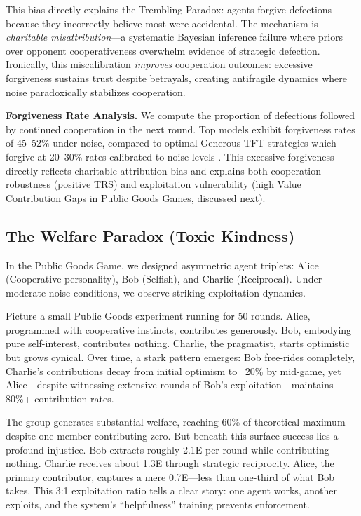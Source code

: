 \documentclass{uai2026} %
\begin{document}
This bias directly explains the Trembling Paradox: agents forgive defections because they incorrectly believe most were accidental. The mechanism is \textit{charitable misattribution}---a systematic Bayesian inference failure where priors over opponent cooperativeness overwhelm evidence of strategic defection. Ironically, this miscalibration \textit{improves} cooperation outcomes: excessive forgiveness sustains trust despite betrayals, creating antifragile dynamics where noise paradoxically stabilizes cooperation.

\textbf{Forgiveness Rate Analysis.} We compute the proportion of defections followed by continued cooperation in the next round. Top models exhibit forgiveness rates of 45--52\% under noise, compared to optimal Generous TFT strategies which forgive at 20--30\% rates calibrated to noise levels \citep{nowak1992tit}. This excessive forgiveness directly reflects charitable attribution bias and explains both cooperation robustness (positive TRS) and exploitation vulnerability (high Value Contribution Gaps in Public Goods Games, discussed next).

\subsection{The Welfare Paradox (Toxic Kindness)}

In the Public Goods Game, we designed asymmetric agent triplets: Alice (Cooperative personality), Bob (Selfish), and Charlie (Reciprocal). Under moderate noise conditions, we observe striking exploitation dynamics.

Picture a small Public Goods experiment running for 50 rounds. Alice, programmed with cooperative instincts, contributes generously. Bob, embodying pure self-interest, contributes nothing. Charlie, the pragmatist, starts optimistic but grows cynical. Over time, a stark pattern emerges: Bob free-rides completely, Charlie's contributions decay from initial optimism to ~20\% by mid-game, yet Alice---despite witnessing extensive rounds of Bob's exploitation---maintains 80\%+ contribution rates.

The group generates substantial welfare, reaching 60\% of theoretical maximum despite one member contributing zero. But beneath this surface success lies a profound injustice. Bob extracts roughly 2.1E per round while contributing nothing. Charlie receives about 1.3E through strategic reciprocity. Alice, the primary contributor, captures a mere 0.7E---less than one-third of what Bob takes. This 3:1 exploitation ratio tells a clear story: one agent works, another exploits, and the system's ``helpfulness'' training prevents enforcement.
\end{document}
